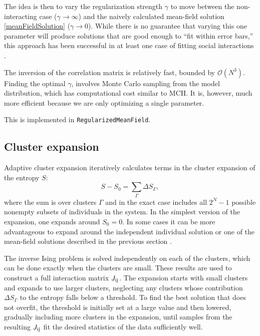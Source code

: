 \documentclass{jors}
\begin{document}
The idea is then to vary the regularization strength $\gamma$ to move between the
non-interacting case ($\gamma \rightarrow \infty$) and the naively calculated
mean-field solution \eqref{meanFieldSolution} ($\gamma \rightarrow 0$).
While there is no guarantee that varying this one parameter will produce solutions that are
good enough to ``fit within error bars,'' this approach has been successful in at least
one case of fitting social interactions \cite{Daniels:2017cq}.

The inversion of the correlation matrix is relatively fast, bounded by $\mathcal{O}(N^3)$. Finding the optimal $\gamma$, involves Monte Carlo sampling from the model distribution, which has computational cost similar to MCH. It is, however, much more efficient because we are only optimizing a single parameter.

This is implemented in {\tt RegularizedMeanField}.



\subsection*{Cluster expansion}

Adaptive cluster expansion \cite{Monasson:2011fo,Monasson:2011fo,Barton:2013fja}
iteratively calculates terms in the
cluster expansion of the entropy $S$:
\begin{equation}
S - S_0 = \sum_\Gamma \Delta S_\Gamma,
\end{equation}
where the sum is over clusters $\Gamma$ and in the exact case
includes all $2^N - 1$ possible nonempty subsets of individuals in the system.  In the simplest version of the expansion,
one expands around $S_0 = 0$.  In some cases it can be more advantageous to
expand around
the independent individual solution or one of the mean-field solutions
described in the previous section \cite{Barton:2013fja}.

The inverse Ising problem is solved independently
on each of the clusters, which can be done exactly when the
clusters are small.  These results are used to construct a full
interaction matrix $J_{\rm ij}$.
The expansion starts with small clusters and expands to use larger
clusters, neglecting any clusters whose
contribution $\Delta S_\Gamma$ to the entropy falls below a threshold.
To find the best solution that does not overfit,
the threshold is initially set at a large value and then lowered,
gradually including more clusters in the expansion, until samples from
the resulting $J_{\rm ij}$ fit the desired statistics of the data sufficiently well.
\end{document}
